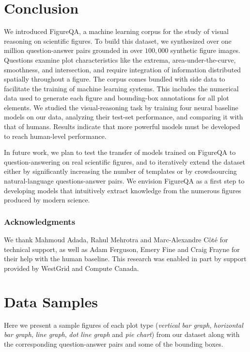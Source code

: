 \documentclass{article} \usepackage{iclr2018_workshop,times}
\begin{document}
\FloatBarrier

\section{Conclusion}
We introduced FigureQA, a machine learning corpus for the study of visual reasoning on scientific figures.
To build this dataset, we synthesized over one million question-answer pairs grounded in over $100,000$ synthetic figure images.
Questions examine plot characteristics like the extrema, area-under-the-curve, smoothness, and intersection, and require integration of information distributed spatially throughout a figure.
The corpus comes bundled with side data to facilitate the training of machine learning systems.
This includes the numerical data used to generate each figure and bounding-box annotations for all plot elements.
We studied the visual-reasoning task by training four neural baseline models on our data, analyzing their test-set performance, and comparing it with that of humans.
Results indicate that more powerful models must be developed to reach human-level performance.

In future work, we plan to test the transfer of models trained on FigureQA to question-answering on real scientific figures, and to iteratively extend the dataset either by significantly increasing the number of templates or by crowdsourcing natural-language questions-answer pairs.
We envision FigureQA as a first step to developing models that intuitively extract knowledge from the numerous figures produced by modern science.




\subsubsection*{Acknowledgments}
We thank Mahmoud Adada, Rahul Mehrotra and Marc-Alexandre Côté for technical support, as well as Adam Ferguson, Emery Fine and Craig Frayne for their help with the human baseline. This research was enabled in part by support provided by WestGrid and Compute Canada.




\newpage
\appendix
\section{Data Samples}
\label{sec:samples}
Here we present a sample figures of each plot type (\emph{vertical bar graph}, \emph{horizontal bar graph}, \emph{line graph}, \emph{dot line graph} and \emph{pie chart}) from our dataset along with the corresponding question-answer pairs and some of the bounding boxes.
\end{document}
